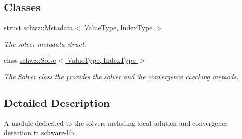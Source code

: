 \subsection*{Classes}
\begin{DoxyCompactItemize}
\item 
struct \hyperlink{structschwz_1_1Metadata}{schwz\+::\+Metadata$<$ Value\+Type, Index\+Type $>$}
\begin{DoxyCompactList}\small\item\em The solver metadata struct. \end{DoxyCompactList}\item 
class \hyperlink{classschwz_1_1Solve}{schwz\+::\+Solve$<$ Value\+Type, Index\+Type $>$}
\begin{DoxyCompactList}\small\item\em The Solver class the provides the solver and the convergence checking methods. \end{DoxyCompactList}\end{DoxyCompactItemize}


\subsection{Detailed Description}
A module dedicated to the solvers including local solution and convergence detection in schwarz-\/lib. 

